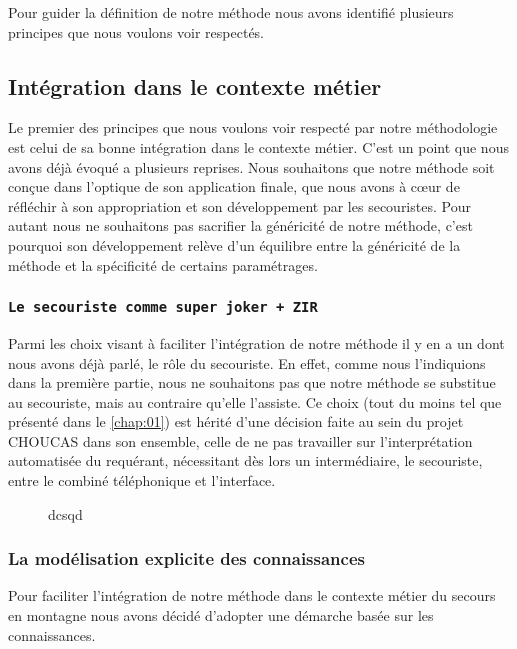 Pour guider la définition de notre méthode nous avons identifié
plusieurs principes que nous voulons voir respectés.

\subsection{Intégration dans le contexte métier}

Le premier des principes que nous voulons voir respecté par notre
méthodologie est celui de sa bonne intégration dans le contexte
métier.
%
C'est un point que nous avons déjà évoqué a plusieurs reprises. Nous
souhaitons que notre méthode soit conçue dans l'optique de son
application finale, \ie que nous avons à cœur de réfléchir à son
appropriation et son développement par les secouristes. Pour autant
nous ne souhaitons pas sacrifier la généricité de notre méthode, c'est
pourquoi son développement relève d'un équilibre entre la généricité
de la méthode et la spécificité de certains paramétrages.

\subsubsection{\texttt{Le secouriste comme super joker + ZIR}}

Parmi les choix visant à faciliter l'intégration de notre méthode il y
en a un dont nous avons déjà parlé, le rôle du secouriste. En effet,
comme nous l'indiquions dans la première partie, nous ne souhaitons
pas que notre méthode se substitue au secouriste, mais au contraire
qu'elle l’assiste. Ce choix (tout du moins tel que présenté dans le
\autoref{chap:01}) est hérité d'une décision faite au sein du projet
CHOUCAS dans son ensemble, celle de ne pas travailler sur
l'interprétation automatisée du requérant, nécessitant dès lors un
intermédiaire, le secouriste, entre le combiné téléphonique et
l'interface.

\begin{figure}
  \centering
  \caption{dcsqd}
  \label{fig:diag_acti_secours}
\end{figure}

\subsubsection{La modélisation explicite des connaissances}

Pour faciliter l'intégration de notre méthode dans le contexte métier
du secours en montagne nous avons décidé d'adopter une démarche basée
sur les connaissances.

